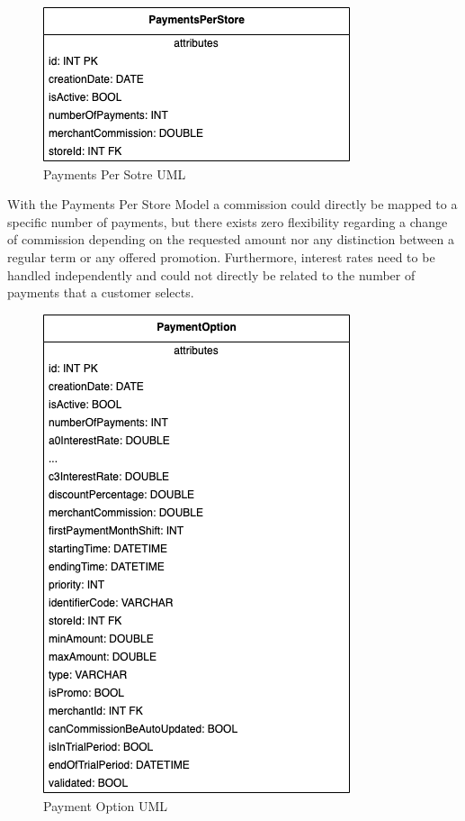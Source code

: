 \begin{figure} [H]
    \centering
    \includegraphics[scale = 0.6]{assets/uml/Payments_Per_Store.png}
    \caption{Payments Per Sotre UML}\label{fig:uml_payments_per_store}
\end{figure}

With the Payments Per Store Model a commission could directly be mapped to a specific number of payments, but there exists zero flexibility regarding a change of commission depending on the requested amount nor any distinction between a regular term or any offered promotion. Furthermore, interest rates need to be handled independently and could not directly be related to the number of payments that a customer selects.

\begin{figure} [H]
    \centering
    \includegraphics[scale = 0.6]{assets/uml/PaymentOptions.png}
    \caption{Payment Option UML}\label{fig:uml_payment_options}
\end{figure}

